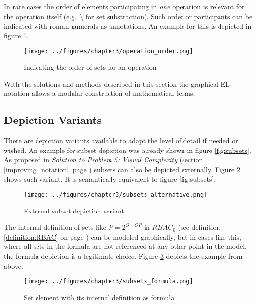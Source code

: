 \documentclass[twoside, openright, 12pt]{book}
\begin{document}
\noindent
In rare cases the order of elements participating in \textit{one} operation is relevant for the operation itself (e.g.~$\setminus$ for set substraction).
Such order or participants can be indicated with roman numerals as annotations.
An example for this is depicted in figure \ref{fig:operation_order}.

\begin{figure}[!htb]
	\centering
	\texttt{[image: ../figures/chapter3/operation\_order.png]}
	\caption{Indicating the order of sets for an operation}
	\label{fig:operation_order}
\end{figure}

\noindent
With the solutions and methods described in this section the graphical EL notation allows a modular construction of mathematical terms.



\subsection{Depiction Variants}
\label{variants}
There are depiction variants available to adapt the level of detail if needed or wished.
An example for subset depiction was already shown in figure \ref{fig:subsets}.
As proposed in \textit{Solution to Problem 5: Visual Complexity} (section \ref{improving_notation}, page \pageref{improving_notation}) subsets can also be depicted externally.
Figure \ref{fig:subsets_alternative} shows such variant.
It is semantically equivalent to figure \ref{fig:subsets}.

\begin{figure}[htb]
	\centering
	\texttt{[image: ../figures/chapter3/subsets\_alternative.png]}
	\caption{External subset depiction variant}
	\label{fig:subsets_alternative}
\end{figure}

\noindent
The internal definition of sets like $P = 2^{O \times OP}$ in $RBAC_0$ (see definition \ref{definition:RBAC} on page \pageref{definition:RBAC}) can be modeled graphically, but in cases like this, where all sets in the formula are not referenced at any other point in the model, the formula depiction is a legitimate choice.
Figure \ref{fig:subsets_formula} depicts the example from above.

\begin{figure}[htb]
	\centering
	\texttt{[image: ../figures/chapter3/subsets\_formula.png]}
	\caption{Set element with its internal definition as formula}
	\label{fig:subsets_formula}
\end{figure}
\end{document}
